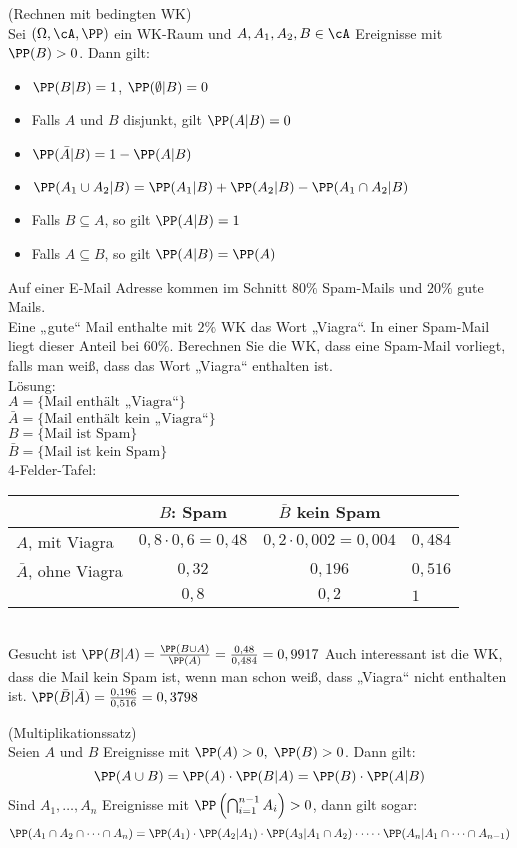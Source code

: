  (Rechnen mit bedingten WK)\\
Sei $(\Omega, \cA, \PP)$ ein WK-Raum und $A, A_1, A_2, B \in \cA$ Ereignisse mit $\PP(B)>0$. Dann gilt:
\begin{itemize}
\item $\PP(B|B)=1$, $\PP(\emptyset|B)=0$
\item Falls $A$ und $B$ disjunkt, gilt $\PP(A|B)=0$
\item $\PP(\bar A | B) = 1-\PP(A|B)$
\item $\PP(A_1 \cup A_2 | B ) =\PP(A_1 | B ) + \PP (A_2|B) - \PP (A_1 \cap A_2 | B)$
\item Falls $B\subseteq A$, so gilt $\PP(A|B)=1$
\item Falls $A \subseteq B$, so gilt $\PP(A|B)=\PP(A)$
\end{itemize}

 Auf einer E-Mail Adresse kommen im Schnitt $80\%$ Spam-Mails und $20\%$ gute Mails.\\
Eine „gute“ Mail enthalte mit $2\%$ WK das Wort „Viagra“. In einer Spam-Mail liegt dieser Anteil bei $60\%$. Berechnen Sie die WK, dass eine Spam-Mail vorliegt, falls man weiß, dass das Wort „Viagra“ enthalten ist.\\
Lösung:\\
$A=\{\text{Mail enthält „Viagra“}\}$\\
$\bar A=\{\text{Mail enthält kein „Viagra“}\}$\\
$B=\{\text{Mail ist Spam}\}$\\
$\bar B=\{\text{Mail ist kein Spam}\}$\\
4-Felder-Tafel:\\
\begin{tabular}{l | c | c | l}
& $B$: Spam & $\bar B$ kein Spam & \\
\hline
$A$, mit Viagra & $0,8\cdot 0,6=0,48$ & $0,2 \cdot 0,002=0,004$ & $0,484$\\
$\bar A$, ohne Viagra & $0,32$ & $0,196$ & $0,516$\\
\hline 
& $0,8$ & $0,2$ & $1$
\end{tabular}\\
Gesucht ist $\PP(B|A)=\frac{\PP(B\cup A)}{\PP(A)}=\frac{0,48}{0,484}=0,9917$
Auch interessant ist die WK, dass die Mail kein Spam ist, wenn man schon weiß, dass „Viagra“ nicht enthalten ist. $\PP(\bar B | \bar A)=\frac{0,196}{0,516}=0,3798$

 (Multiplikationssatz)\\
Seien $A$ und $B$ Ereignisse mit $\PP(A)>0,\; \PP(B)>0$. Dann gilt:
$$\PP(A\cup B ) = \PP(A ) \cdot \PP(B|A) = \PP(B) \cdot \PP(A|B)$$
Sind $A_1,\dots,A_n$ Ereignisse mit $\PP\left( \bigcap_{i=1}^{n-1} A_i\right) >0$, dann gilt sogar:
$$\PP(A_1\cap A_2 \cap \dots \cap A_n)=\PP(A_1)\cdot \PP(A_2|A_1) \cdot \PP (A_3|A_1 \cap A_2)\cdot \dots \cdot \PP(A_n|A_1 \cap \dots \cap A_{n-1})$$

